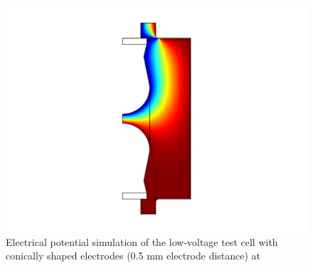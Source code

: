 \begin{figure}[htbp]
	\centering
	\includegraphics[scale=0.3]{figures/Method/Part1_d_C0/conic.png}		
	\caption[Kurze Abbildungsbeschreibung]{Electrical potential simulation of the low-voltage test cell with conically shaped electrodes (0.5 mm electrode distance) at } \label{fig.comsol_conic}

\end{figure}

